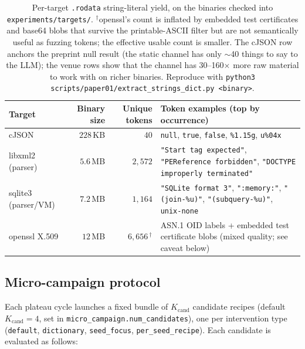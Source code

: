 \documentclass[11pt]{article}
\begin{document}
\begin{table}[H]
  \centering
  \footnotesize
  \setlength{\tabcolsep}{6pt}
  \begin{tabular}{@{}lrr Y{7.5cm}@{}}
    \toprule
    Target & Binary size & Unique tokens & Token examples (top by occurrence) \\
    \midrule
    cJSON              & $228$\,KB & $40$       & \texttt{null}, \texttt{true}, \texttt{false}, \texttt{\%1.15g}, \texttt{u\%04x} \\
    libxml2 (parser)   & $5.6$\,MB & $2{,}572$  & \texttt{"Start tag expected"}, \texttt{"PEReference forbidden"}, \texttt{"DOCTYPE improperly terminated"} \\
    sqlite3 (parser/VM)& $7.2$\,MB & $1{,}164$  & \texttt{"SQLite format 3"}, \texttt{":memory:"}, \texttt{"(join-\%u)"}, \texttt{"(subquery-\%u)"}, \texttt{unix-none} \\
    openssl X.509      & $12$\,MB  & $6{,}656$\,$^{\dagger}$ & ASN.1 OID labels + embedded test certificate blobs (mixed quality; see caveat below) \\
    \bottomrule
  \end{tabular}
  \caption{Per-target \texttt{.rodata} string-literal yield, on the
  binaries checked into \texttt{experiments/targets/}.
  $^{\dagger}$openssl's count is inflated by embedded test
  certificates and base64 blobs that survive the printable-ASCII
  filter but are not semantically useful as fuzzing tokens; the
  effective usable count is smaller. The cJSON row anchors the
  preprint null result (the static channel has only $\sim$40
  things to say to the LLM); the venue rows show that the channel
  has 30--160$\times$ more raw material to work with on richer
  binaries. Reproduce with
  \texttt{python3 scripts/paper01/extract\_strings\_dict.py <binary>}.}
  \label{tab:ghidra-yield}
\end{table}

\subsection{Micro-campaign protocol}
\label{sec:plateau:micro}

Each plateau cycle launches a fixed bundle of $K_{\text{cand}}$
candidate recipes (default $K_{\text{cand}}=4$, set in
\texttt{micro\_campaign.num\_candidates}), one per intervention type
(\texttt{default}, \texttt{dictionary}, \texttt{seed\_focus},
\texttt{per\_seed\_recipe}). Each candidate is evaluated as follows:
\end{document}
